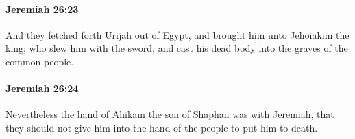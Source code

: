 		\paragraph{Jeremiah 26:23} %
			\label{JEREMIAH-26-23}

			And they fetched forth Urijah out of Egypt, and brought him unto Jehoiakim the king; who slew him with the sword, and cast his dead body into the graves of the common people.


		\paragraph{Jeremiah 26:24} %
			\label{JEREMIAH-26-24}

			Nevertheless the hand of Ahikam the son of Shaphan was with Jeremiah, that they should not give him into the hand of the people to put him to death.

